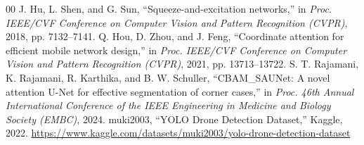 \documentclass[conference]{IEEEtran}
\begin{document}
\begin{thebibliography}{00}
 J. Hu, L. Shen, and G. Sun, ``Squeeze-and-excitation networks,'' in \textit{Proc. IEEE/CVF Conference on Computer Vision and Pattern Recognition (CVPR)}, 2018, pp. 7132--7141.
 Q. Hou, D. Zhou, and J. Feng, ``Coordinate attention for efficient mobile network design,'' in \textit{Proc. IEEE/CVF Conference on Computer Vision and Pattern Recognition (CVPR)}, 2021, pp. 13713--13722.
 S. T. Rajamani, K. Rajamani, R. Karthika, and B. W. Schuller, ``CBAM\_SAUNet: A novel attention U-Net for effective segmentation of corner cases,'' in \textit{Proc. 46th Annual International Conference of the IEEE Engineering in Medicine and Biology Society (EMBC)}, 2024.
 muki2003, ``YOLO Drone Detection Dataset,'' Kaggle, 2022. \url{https://www.kaggle.com/datasets/muki2003/yolo-drone-detection-dataset}
\end{thebibliography}
\end{document}
